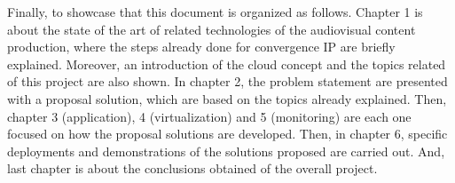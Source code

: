 Finally, to showcase that this document is organized as follows. Chapter 1 is about the state of the art of related technologies of the audiovisual content production, where the steps already done for convergence IP are briefly explained. Moreover, an introduction of the cloud concept and the topics related of this project are also shown. In chapter 2, the problem statement are presented with a proposal solution, which are based on the topics already explained. Then, chapter 3 (application), 4 (virtualization) and 5 (monitoring) are each one focused on how the proposal solutions are developed. Then, in chapter 6, specific deployments and demonstrations of the solutions proposed are carried out. And, last chapter is about the conclusions obtained of the overall project.





